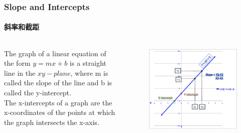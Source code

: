 \documentclass[
	11pt, %
	handout,
]{beamer}
\begin{document}
\begin{frame}
	\frametitle{Slope and Intercepts}
	\framesubtitle{斜率和截距}

	\begin{columns}[t] 
		\begin{column}{0.4\textwidth} %
			\begin{definition}
						The graph of a linear equation of the form $y = mx + b$ is a straight line
				in the $xy-plane$, where m is called the \alert{slope} of the line and b is called the \alert{y-intercept}. \\
				The x-intercepts of a graph are the \alert{x-coordinates} of the points at which the graph intersects the x-axis.
			\end{definition}
		\end{column}
		\begin{column}{0.6\textwidth} %
			\begin{figure}
				\includegraphics[width=\linewidth]{how-to-calculate-slope-and-intercepts-of-a-line-thumb-mMPHze60u.jpeg}
			\end{figure}
    \end{column}
	\end{columns}
\end{frame}


\end{document}
